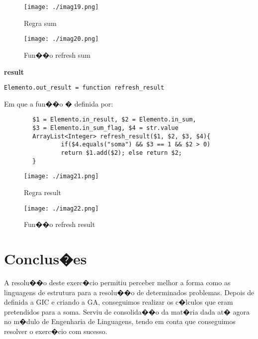 \documentclass[a4paper]{article}
\begin{document}
\begin{figure}[H]
 \centering
 \texttt{[image: ./imag19.png]}
 \caption{Regra sum}
\end{figure}

\begin{figure}[H]
 \centering
 \texttt{[image: ./imag20.png]}
 \caption{Fun��o refresh sum}
\end{figure}



\textbf{result}\\
\begin{verbatim}
Elemento.out_result = function refresh_result
\end{verbatim}
Em que a fun��o � definida por:
\begin{verbatim}
        $1 = Elemento.in_result, $2 = Elemento.in_sum, 
        $3 = Elemento.in_sum_flag, $4 = str.value
        ArrayList<Integer> refresh_result($1, $2, $3, $4){
                if($4.equals("soma") && $3 == 1 && $2 > 0) 
                return $1.add($2); else return $2;
        }
\end{verbatim}

\begin{figure}[H]
 \centering
 \texttt{[image: ./imag21.png]}
 \caption{Regra result}
\end{figure}

\begin{figure}[H]
 \centering
 \texttt{[image: ./imag22.png]}
 \caption{Fun��o refresh result}
\end{figure}


\section{Conclus�es}
A resolu��o deste exerc�cio permitiu perceber melhor a forma como as linguagens 
de estrutura para a resolu��o de determinados problemas. Depois de definida a GIC e 
criando a GA, conseguimos realizar os c�lculos que eram pretendidos para a soma.
Serviu de consolida��o da mat�ria dada at� agora no m�dulo de Engenharia de Linguagens,
tendo em conta que conseguimos resolver o exerc�cio com sucesso.
\end{document}
